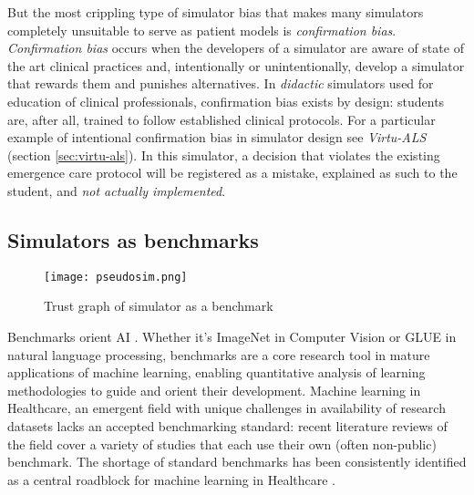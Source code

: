 But the most crippling type of simulator bias that makes many simulators completely unsuitable to serve as patient models is \emph{confirmation bias}.
\emph{Confirmation bias} occurs when the developers of a simulator are aware of state of the art clinical practices and, intentionally or unintentionally, develop a simulator that rewards them and punishes alternatives.  
In \emph{didactic} simulators used for education of clinical professionals, confirmation bias exists by design: students are, after all, trained to follow established clinical protocols.
For a particular example of intentional confirmation bias in simulator design see \emph{Virtu-ALS} (section \ref{sec:virtu-als}). 
In this simulator, a decision that violates the existing emergence care protocol will be registered as a mistake, explained as such to the student, and \emph{not actually implemented}.

\subsection{Simulators as benchmarks}

\begin{figure}
    \centering
    \texttt{[image: pseudosim.png]}
    \caption{Trust graph of simulator as a benchmark}
    \label{fig:benchmark}
\end{figure}

Benchmarks orient AI \cite{liangHolisticEvaluationLanguage2022}. Whether it's ImageNet \cite{dengImagenetLargescaleHierarchical2009} in Computer Vision or GLUE \cite{wangGLUEMultitaskBenchmark2018} in natural language processing, benchmarks are a core research tool in mature applications of machine learning, enabling quantitative analysis of learning methodologies to guide and orient their development.
Machine learning in Healthcare, an emergent field with unique challenges in availability of research datasets \cite{Anshik2021Handling, Gilbert2015market, Pahwa2021Big, Yazhini2019State} lacks an accepted benchmarking standard: recent literature reviews \cite{palMachineLearningHealthcare2023,tortorellaHealthcareTrendsChallenges2020} of the field cover a variety of studies that each use their own (often non-public) benchmark. The shortage of standard benchmarks has been consistently identified as a central roadblock for machine learning in Healthcare
\cite{Crown2015Potential, David2020Evaluating, guSupervisedLearningPervasive2023, harutyunyanMultitaskLearningBenchmarking2019, Kathrin2022Benchmark, mcdermottReproducibilityMachineLearning2021, purushothamBenchmarkingDeepLearning2018, S2017Benchmark}.

